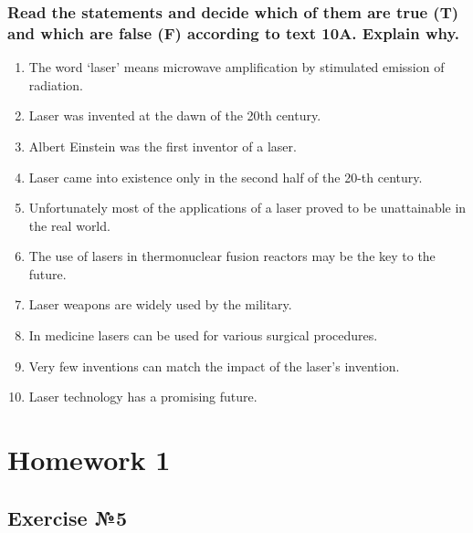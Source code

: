 \documentclass[12pt, a4paper]{report}
\begin{document}
\subsection*{Read the statements and decide which of them are true (T) and
    which are false (F) according to text 10A. Explain why.}
\begin{enumerate}
    \item The word ‘laser’ means microwave amplification by stimulated emission
          of radiation.
    \item Laser was invented at the dawn of the 20th century.
    \item Albert Einstein was the first inventor of a laser.
    \item Laser came into existence only in the second half of the 20-th century.
    \item Unfortunately most of the applications of a laser proved to be unattainable
          in the real world.
    \item The use of lasers in thermonuclear fusion reactors may be the key
          to the future.
    \item Laser weapons are widely used by the military.
    \item In medicine lasers can be used for various surgical procedures.
    \item Very few inventions can match the impact of the laser’s invention.
    \item Laser technology has a promising future.
\end{enumerate} \leavevmode\newline


\chapter{Homework 1}

\section{Exercise №5}
\end{document}
